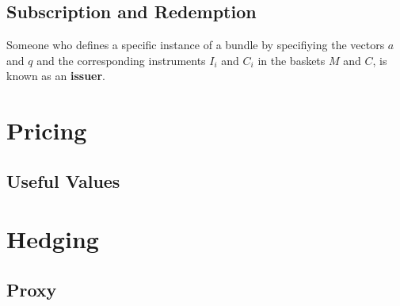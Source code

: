 \documentclass[11pt,fleqn]{book} %
\begin{document}
\section{Subscription and Redemption}

\begin{definition} \label{def:121}
Someone who defines a specific instance of a bundle by specifiying the vectors \(a\) and \(q\) and the corresponding 
instruments \(I_i\) and \(C_i\) in the baskets \(M\) and \(C\), is known as an \textbf{issuer}.
\end{definition}





\chapter{Pricing}


\section{Useful Values}




\chapter{Hedging}


\section{Proxy}

\end{document}
